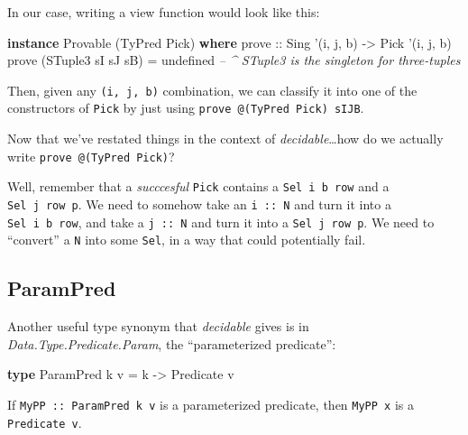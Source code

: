 \documentclass[]{article}
\newenvironment{Shaded}{}{}
\newcommand{\CommentTok}[1]{\textcolor[rgb]{0.38,0.63,0.69}{\textit{#1}}}
\newcommand{\DataTypeTok}[1]{\textcolor[rgb]{0.56,0.13,0.00}{#1}}
\newcommand{\FunctionTok}[1]{\textcolor[rgb]{0.02,0.16,0.49}{#1}}
\newcommand{\KeywordTok}[1]{\textcolor[rgb]{0.00,0.44,0.13}{\textbf{#1}}}
\newcommand{\NormalTok}[1]{#1}
\newcommand{\OtherTok}[1]{\textcolor[rgb]{0.00,0.44,0.13}{#1}}
\begin{document}
In our case, writing a view function would look like this:

\begin{Shaded}
\begin{Highlighting}[]
\KeywordTok{instance} \DataTypeTok{Provable}\NormalTok{ (}\DataTypeTok{TyPred} \DataTypeTok{Pick}\NormalTok{) }\KeywordTok{where}
\OtherTok{    prove ::} \DataTypeTok{Sing}\NormalTok{ '(i, j, b) }\OtherTok{->} \DataTypeTok{Pick}\NormalTok{ '(i, j, b)}
\NormalTok{    prove (}\DataTypeTok{STuple3}\NormalTok{ sI sJ sB) }\FunctionTok{=}\NormalTok{ undefined}
        \CommentTok{-- ^ STuple3 is the singleton for three-tuples}
\end{Highlighting}
\end{Shaded}

Then, given any \texttt{(i,\ j,\ b)} combination, we can classify it into one of
the constructors of \texttt{Pick} by just using
\texttt{prove\ @(TyPred\ Pick)\ sIJB}.

Now that we've restated things in the context of \emph{decidable}\ldots{}how do
we actually write \texttt{prove\ @(TyPred\ Pick)}?

Well, remember that a \emph{succcesful} \texttt{Pick} contains a
\texttt{Sel\ i\ b\ row} and a \texttt{Sel\ j\ row\ p}. We need to somehow take
an \texttt{i\ ::\ N} and turn it into a \texttt{Sel\ i\ b\ row}, and take a
\texttt{j\ ::\ N} and turn it into a \texttt{Sel\ j\ row\ p}. We need to
``convert'' a \texttt{N} into some \texttt{Sel}, in a way that could potentially
fail.

\hypertarget{parampred}{%
\subsection{ParamPred}\label{parampred}}

Another useful type synonym that \emph{decidable} gives is in
\emph{Data.Type.Predicate.Param}, the ``parameterized predicate'':

\begin{Shaded}
\begin{Highlighting}[]
\KeywordTok{type} \DataTypeTok{ParamPred}\NormalTok{ k v }\FunctionTok{=}\NormalTok{ k }\OtherTok{->} \DataTypeTok{Predicate}\NormalTok{ v}
\end{Highlighting}
\end{Shaded}

If \texttt{MyPP\ ::\ ParamPred\ k\ v} is a parameterized predicate, then
\texttt{MyPP\ x} is a \texttt{Predicate\ v}.
\end{document}

